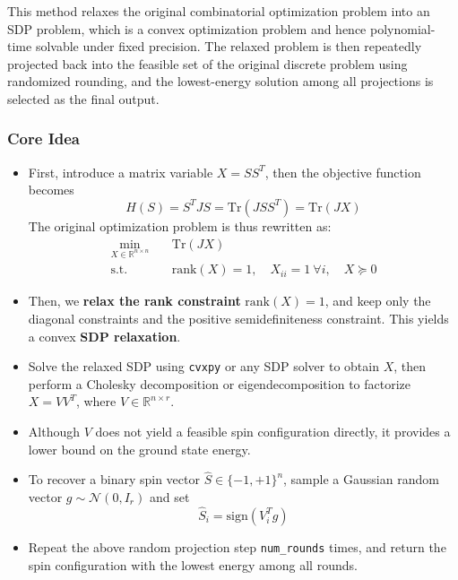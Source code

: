 \documentclass{article}
\begin{document}
This method relaxes the original combinatorial optimization problem into an SDP problem, which is a convex optimization problem and hence polynomial-time solvable under fixed precision. The relaxed problem is then repeatedly projected back into the feasible set of the original discrete problem using randomized rounding, and the lowest-energy solution among all projections is selected as the final output.

\subsubsection*{Core Idea}

\begin{itemize}
    \item First, introduce a matrix variable $X = SS^{T}$, then the objective function becomes
    \[
    H\left(S\right) = S^{T}JS = \mathrm{Tr}\left(JSS^{T}\right) = \mathrm{Tr}\left(JX\right)
    \]
    The original optimization problem is thus rewritten as:
    \[
    \begin{aligned}
    \min_{X \in \mathbb{R}^{n \times n}} \quad & \mathrm{Tr}(JX) \\
    \text{s.t.} \quad & \text{rank}(X) = 1, \quad X_{ii} = 1 \ \forall i, \quad X \succeq 0
    \end{aligned}
    \]
    
    \item Then, we \textbf{relax the rank constraint} $\text{rank}\left(X\right) = 1$, and keep only the diagonal constraints and the positive semidefiniteness constraint. This yields a convex \textbf{SDP relaxation}.
    \item Solve the relaxed SDP using \texttt{cvxpy} or any SDP solver to obtain $X$, then perform a Cholesky decomposition or eigendecomposition to factorize $X = VV^{T}$, where $V \in \mathbb{R}^{n \times r}$.
    \item Although $V$ does not yield a feasible spin configuration directly, it provides a lower bound on the ground state energy.
    \item To recover a binary spin vector $\hat{S} \in \{-1, +1\}^n$, sample a Gaussian random vector $g \sim \mathcal{N}(0, I_r)$ and set
    \[
    \hat{S}_i = \text{sign}(V_i^{T}g)
    \]
    \item Repeat the above random projection step \texttt{num\_rounds} times, and return the spin configuration with the lowest energy among all rounds.
\end{itemize}
\end{document}
